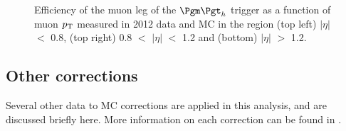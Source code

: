 \begin{figure}[htb]

\begin{center}
\end{center}
\caption{Efficiency of the muon leg of the $\mutau$ trigger as a function of muon $p_{\mathrm{T}}$ measured in
2012 data and MC in the region (top left) $|\eta|$ $<$ 0.8, (top right) 0.8
$<$ $|\eta|$ $<$ 1.2 and (bottom) $|\eta|$ $>$ 1.2.}
\label{fig:muontrg}
\end{figure}

\subsection{Other corrections}
\label{sec:othercorrections}

Several other data to \ac{MC} corrections are applied in this analysis, and are
discussed briefly here. More information on each correction can be found in
\cite{HIG-13-004}. 

